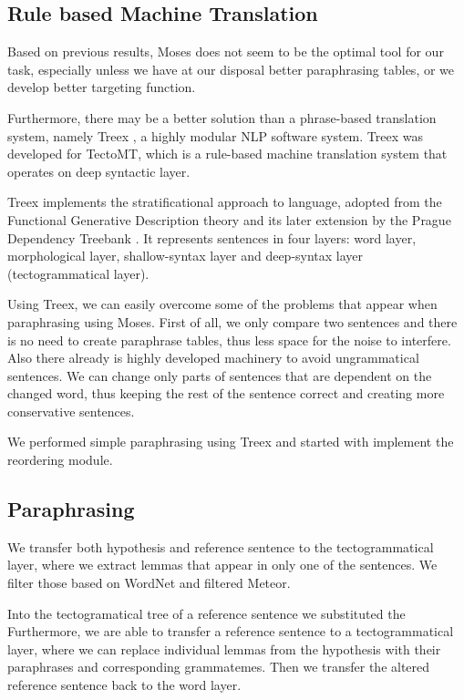 \documentclass[11pt]{article}
\begin{document}
\subsection{Rule based Machine Translation}
Based on previous results, Moses does not seem to be the optimal tool for our 
task, especially unless we have at our disposal better paraphrasing tables, or
we develop better targeting function. %

Furthermore, there may be a better solution than a phrase-based translation
system, namely Treex \cite{treex}, a highly modular NLP software system. Treex
was developed for TectoMT, which is a rule-based machine translation system 
that operates on deep syntactic layer.

Treex implements the stratificational approach to language, adopted from the 
Functional Generative Description theory \cite{FGP} and its later extension by 
the Prague Dependency Treebank \cite{PDT3.0}. It represents sentences in four 
layers: word layer, morphological layer, shallow-syntax layer and deep-syntax 
layer (tectogrammatical layer).

Using Treex, we can easily overcome some of the problems that appear when 
paraphrasing using Moses. First of all, we only compare two sentences and there 
is no need to create paraphrase tables, thus less space for the noise to 
interfere. Also there already is highly developed machinery to avoid 
ungrammatical sentences. We can change only parts of sentences that are 
dependent on the changed word, thus keeping the rest of the sentence correct 
and creating more conservative sentences.

We performed simple paraphrasing using Treex and started with implement the
reordering module.

\subsection{Paraphrasing}
We transfer both hypothesis and reference sentence to the tectogrammatical 
layer, where we extract lemmas that appear in only one of the sentences. We 
filter those based on WordNet and filtered Meteor.

Into the tectogramatical tree of a reference sentence we substituted the 
Furthermore, we are able to transfer a reference sentence to a tectogrammatical 
layer, where we can replace individual lemmas from the hypothesis with their 
paraphrases and corresponding grammatemes. Then we transfer the altered 
reference sentence back to the word layer.
\end{document}
